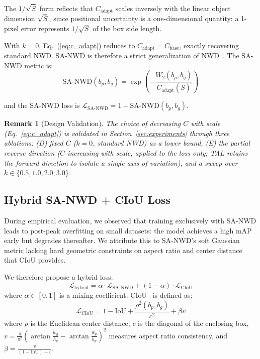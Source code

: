\documentclass[journal]{IEEEtran}
\newtheorem{remark}{Remark}
\begin{document}
The $1/\sqrt{\bar{S}}$ form reflects that $C_{\text{adapt}}$ scales inversely with the linear object dimension $\sqrt{\bar{S}}$, since positional uncertainty is a one-dimensional quantity: a 1-pixel error represents $1/\sqrt{S}$ of the box side length.

With $k=0$, Eq.~(\ref{eq:c_adapt}) reduces to $C_{\text{adapt}} = C_{\text{base}}$, exactly recovering standard NWD. SA-NWD is therefore a strict generalization of NWD~\cite{wang2022nwd}. The SA-NWD metric is:
\begin{equation}
  \text{SA-NWD}(b_p, b_g) = \exp\!\left(-\frac{W_2(b_p, b_g)}{C_{\text{adapt}}(\bar{S})}\right)
  \label{eq:sanwd}
\end{equation}

and the SA-NWD loss is $\mathcal{L}_{\text{SA-NWD}} = 1 - \text{SA-NWD}(b_p, b_g)$.

\begin{remark}[Design Validation]
\label{rem:design_val}
The choice of decreasing $C$ with scale (Eq.~\ref{eq:c_adapt}) is validated in Section~\ref{sec:experiments} through three ablations: (D) fixed $C$ ($k=0$, standard NWD) as a lower bound, (E) the \emph{partial} reverse direction ($C$ increasing with scale, applied to the loss only; TAL retains the forward direction to isolate a single axis of variation), and a sweep over $k \in \{0.5, 1.0, 2.0, 3.0\}$.
\end{remark}

\subsection{Hybrid SA-NWD + CIoU Loss}

During empirical evaluation, we observed that training exclusively with SA-NWD leads to post-peak overfitting on small datasets: the model achieves a high mAP early but degrades thereafter. We attribute this to SA-NWD's soft Gaussian metric lacking hard geometric constraints on aspect ratio and center distance that CIoU provides.

We therefore propose a hybrid loss:
\begin{equation}
  \mathcal{L}_{\text{hybrid}} = \alpha \cdot \mathcal{L}_{\text{SA-NWD}} + (1-\alpha) \cdot \mathcal{L}_{\text{CIoU}}
  \label{eq:hybrid}
\end{equation}
where $\alpha \in [0,1]$ is a mixing coefficient. CIoU~\cite{zheng2020ciou} is defined as:
\begin{equation}
  \mathcal{L}_{\text{CIoU}} = 1 - \text{IoU} + \frac{\rho^2(b_p, b_g)}{c^2} + \beta v
\end{equation}
where $\rho$ is the Euclidean center distance, $c$ is the diagonal of the enclosing box, $v = \frac{4}{\pi^2}(\arctan\frac{w_g}{h_g} - \arctan\frac{w_p}{h_p})^2$ measures aspect ratio consistency, and $\beta = \frac{v}{(1-\text{IoU})+v}$.
\end{document}
